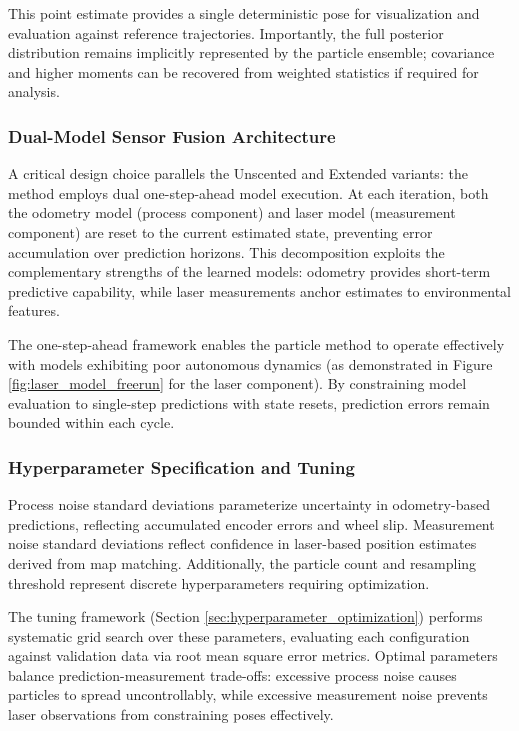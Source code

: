 \documentclass[conference]{IEEEtran}
\begin{document}
This point estimate provides a single deterministic pose for visualization and evaluation against reference trajectories. Importantly, the full posterior distribution remains implicitly represented by the particle ensemble; covariance and higher moments can be recovered from weighted statistics if required for analysis.

\subsubsection{Dual-Model Sensor Fusion Architecture}

A critical design choice parallels the Unscented and Extended variants: the method employs dual one-step-ahead model execution. At each iteration, both the odometry model (process component) and laser model (measurement component) are reset to the current estimated state, preventing error accumulation over prediction horizons. This decomposition exploits the complementary strengths of the learned models: odometry provides short-term predictive capability, while laser measurements anchor estimates to environmental features.

The one-step-ahead framework enables the particle method to operate effectively with models exhibiting poor autonomous dynamics (as demonstrated in Figure \ref{fig:laser_model_freerun} for the laser component). By constraining model evaluation to single-step predictions with state resets, prediction errors remain bounded within each cycle.

\subsubsection{Hyperparameter Specification and Tuning}

Process noise standard deviations parameterize uncertainty in odometry-based predictions, reflecting accumulated encoder errors and wheel slip. Measurement noise standard deviations reflect confidence in laser-based position estimates derived from map matching. Additionally, the particle count and resampling threshold represent discrete hyperparameters requiring optimization.

The tuning framework (Section \ref{sec:hyperparameter_optimization}) performs systematic grid search over these parameters, evaluating each configuration against validation data via root mean square error metrics. Optimal parameters balance prediction-measurement trade-offs: excessive process noise causes particles to spread uncontrollably, while excessive measurement noise prevents laser observations from constraining poses effectively.
\end{document}
